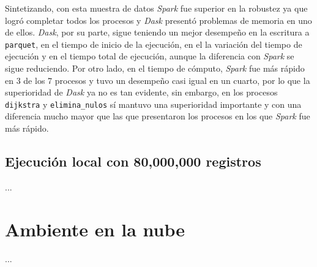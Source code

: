 Sintetizando, con esta muestra de datos \textit{Spark} fue superior en la robustez ya que logró completar todos los procesos y \textit{Dask} presentó problemas de memoria en uno de ellos. \textit{Dask}, por su parte, sigue teniendo un mejor desempeño en la escritura a \texttt{parquet}, en el tiempo de inicio de la ejecución, en el la variación del tiempo de ejecución y en el tiempo total de ejecución, aunque la diferencia con \textit{Spark} se sigue reduciendo. Por otro lado, en el tiempo de cómputo, \textit{Spark} fue más rápido en 3 de los 7 procesos y tuvo un desempeño casi igual en un cuarto, por lo que la superioridad de \textit{Dask} ya no es tan evidente, sin embargo, en los procesos \texttt{dijkstra} y \texttt{elimina\_nulos} sí mantuvo una superioridad importante y con una diferencia mucho mayor que las que presentaron los procesos en los que \textit{Spark} fue más rápido.

\subsection{Ejecución local con 80,000,000 registros}

\noindent ...

\section{Ambiente en la nube}

\noindent ...

